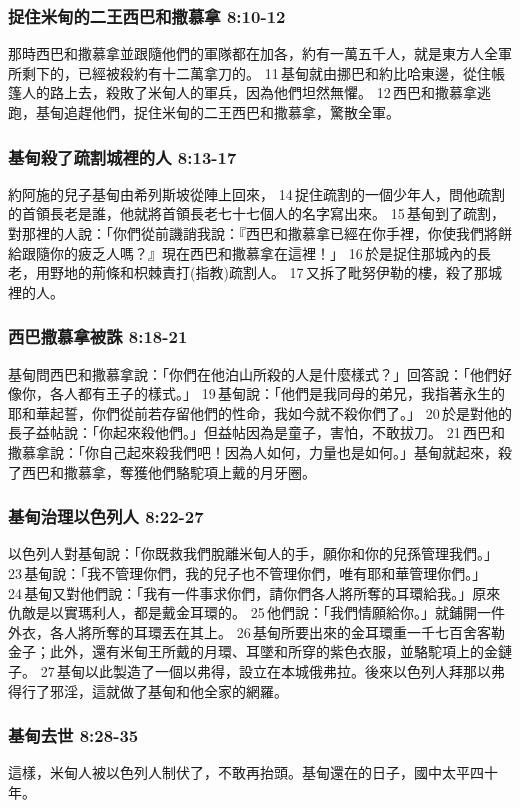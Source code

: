 \subsubsection{捉住米甸的二王西巴和撒慕拿 8:10-12}
那時西巴和撒慕拿並跟隨他們的軍隊都在加各，約有一萬五千人，就是東方人全軍所剩下的，已經被殺約有十二萬拿刀的。 11 基甸就由挪巴和約比哈東邊，從住帳篷人的路上去，殺敗了米甸人的軍兵，因為他們坦然無懼。 12 西巴和撒慕拿逃跑，基甸追趕他們，捉住米甸的二王西巴和撒慕拿，驚散全軍。

\subsubsection{基甸殺了疏割城裡的人 8:13-17}
約阿施的兒子基甸由希列斯坡從陣上回來， 14 捉住疏割的一個少年人，問他疏割的首領長老是誰，他就將首領長老七十七個人的名字寫出來。 15 基甸到了疏割，對那裡的人說：「你們從前譏誚我說：『西巴和撒慕拿已經在你手裡，你使我們將餅給跟隨你的疲乏人嗎？』現在西巴和撒慕拿在這裡！」 16 於是捉住那城內的長老，用野地的荊條和枳棘責打(指教)疏割人。 17 又拆了毗努伊勒的樓，殺了那城裡的人。

\subsubsection{西巴撒慕拿被誅 8:18-21}
基甸問西巴和撒慕拿說：「你們在他泊山所殺的人是什麼樣式？」回答說：「他們好像你，各人都有王子的樣式。」 19 基甸說：「他們是我同母的弟兄，我指著永生的耶和華起誓，你們從前若存留他們的性命，我如今就不殺你們了。」 20 於是對他的長子益帖說：「你起來殺他們。」但益帖因為是童子，害怕，不敢拔刀。 21 西巴和撒慕拿說：「你自己起來殺我們吧！因為人如何，力量也是如何。」基甸就起來，殺了西巴和撒慕拿，奪獲他們駱駝項上戴的月牙圈。

\subsubsection{基甸治理以色列人 8:22-27}
 以色列人對基甸說：「你既救我們脫離米甸人的手，願你和你的兒孫管理我們。」 23 基甸說：「我不管理你們，我的兒子也不管理你們，唯有耶和華管理你們。」 24 基甸又對他們說：「我有一件事求你們，請你們各人將所奪的耳環給我。」原來仇敵是以實瑪利人，都是戴金耳環的。 25 他們說：「我們情願給你。」就鋪開一件外衣，各人將所奪的耳環丟在其上。 26 基甸所要出來的金耳環重一千七百舍客勒金子；此外，還有米甸王所戴的月環、耳墜和所穿的紫色衣服，並駱駝項上的金鏈子。 27 基甸以此製造了一個以弗得，設立在本城俄弗拉。後來以色列人拜那以弗得行了邪淫，這就做了基甸和他全家的網羅。 

\subsubsection{基甸去世 8:28-35}
這樣，米甸人被以色列人制伏了，不敢再抬頭。基甸還在的日子，國中太平四十年。

